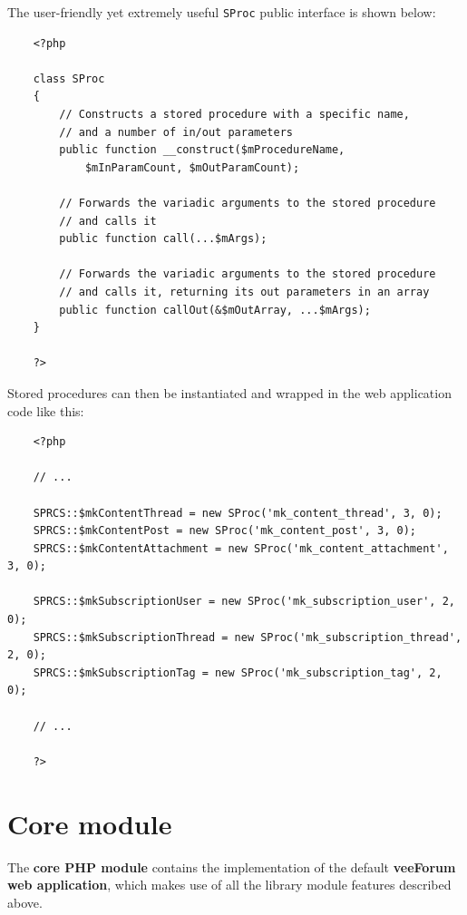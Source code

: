 \documentclass[12pt]{report}
\renewcommand\emph{\textbf}
\begin{document}
                    The user-friendly yet extremely useful \texttt{SProc} public interface is shown below:

                    \begin{verbatim}
    <?php

    class SProc
    {
        // Constructs a stored procedure with a specific name,
        // and a number of in/out parameters
        public function __construct($mProcedureName, 
            $mInParamCount, $mOutParamCount);

        // Forwards the variadic arguments to the stored procedure
        // and calls it
        public function call(...$mArgs);

        // Forwards the variadic arguments to the stored procedure
        // and calls it, returning its out parameters in an array
        public function callOut(&$mOutArray, ...$mArgs);
    }

    ?>
                    \end{verbatim}      

                    Stored procedures can then be instantiated and wrapped in the web application code like this:

                    \begin{verbatim}          
    <?php

    // ...

    SPRCS::$mkContentThread = new SProc('mk_content_thread', 3, 0);
    SPRCS::$mkContentPost = new SProc('mk_content_post', 3, 0);
    SPRCS::$mkContentAttachment = new SProc('mk_content_attachment', 3, 0);

    SPRCS::$mkSubscriptionUser = new SProc('mk_subscription_user', 2, 0);
    SPRCS::$mkSubscriptionThread = new SProc('mk_subscription_thread', 2, 0);
    SPRCS::$mkSubscriptionTag = new SProc('mk_subscription_tag', 2, 0);

    // ...

    ?>
                    \end{verbatim}      

            \section{Core module}

                The \emph{core PHP module} contains the implementation of the default \emph{veeForum web application}, which makes use of all the library module features described above.
\end{document}
